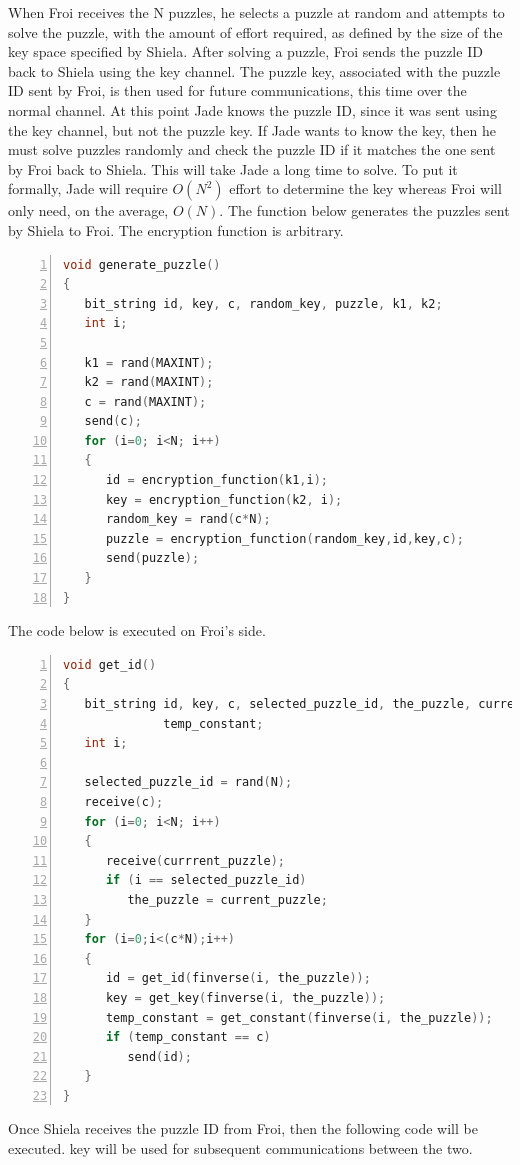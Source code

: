\documentclass{article}
\begin{document}
When Froi receives the N puzzles, he selects a puzzle at random and
attempts to solve the puzzle, with the amount of effort required,
as defined by the size of the key space specified by Shiela. After
solving a puzzle, Froi sends the puzzle ID back to Shiela using the
key channel. The puzzle key, associated with the puzzle ID sent by
Froi, is then used for future communications, this time over the normal
channel. At this point Jade knows the puzzle ID, since it was sent
using the key channel, but not the puzzle key. If Jade wants to know
the key, then he must solve puzzles randomly and check the puzzle
ID if it matches the one sent by Froi back to Shiela. This will take
Jade a long time to solve. To put it formally, Jade will require $O(N^{2})$
effort to determine the key whereas Froi will only need, on the average,
$O(N)$. The function below generates the puzzles sent by Shiela to
Froi. The encryption function is arbitrary.

\begin{lstlisting}[language=C,numbers=left]
void generate_puzzle()
{
   bit_string id, key, c, random_key, puzzle, k1, k2;
   int i;

   k1 = rand(MAXINT);
   k2 = rand(MAXINT);
   c = rand(MAXINT);
   send(c);
   for (i=0; i<N; i++)
   {
      id = encryption_function(k1,i);
      key = encryption_function(k2, i);
      random_key = rand(c*N);
      puzzle = encryption_function(random_key,id,key,c);
      send(puzzle);
   }
}
\end{lstlisting}


The code below is executed on Froi's side.

\begin{lstlisting}[language=C,numbers=left]
void get_id()
{
   bit_string id, key, c, selected_puzzle_id, the_puzzle, current_puzzle,
              temp_constant;
   int i;
   
   selected_puzzle_id = rand(N);
   receive(c);
   for (i=0; i<N; i++)
   {
      receive(currrent_puzzle);
      if (i == selected_puzzle_id)
         the_puzzle = current_puzzle;
   }
   for (i=0;i<(c*N);i++)
   {
      id = get_id(finverse(i, the_puzzle));  
      key = get_key(finverse(i, the_puzzle));
      temp_constant = get_constant(finverse(i, the_puzzle));
      if (temp_constant == c)
         send(id);
   }
}
\end{lstlisting}


Once Shiela receives the puzzle ID from Froi, then the following
code will be executed. key will be used for subsequent communications
between the two.
\end{document}
